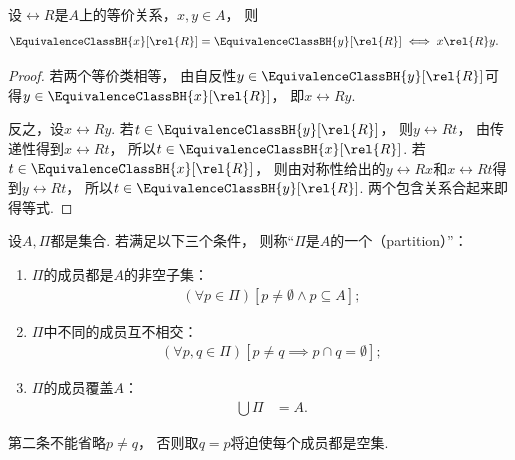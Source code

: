 \begin{lemma}\label{theorem:集合论.相等的等价类的代表等价}
    设\(\rel{R}\)是\(A\)上的等价关系，\(x,y\in A\)，
    则
    \begin{align*}
        \EquivalenceClassBH{x}[\rel{R}]=\EquivalenceClassBH{y}[\rel{R}]
        &\iff x\rel{R}y.
    \end{align*}
    \begin{proof}
        若两个等价类相等，
        由自反性\(y\in\EquivalenceClassBH{y}[\rel{R}]\)可得\(y\in\EquivalenceClassBH{x}[\rel{R}]\)，
        即\(x\rel{R}y\).

        反之，设\(x\rel{R}y\).
        若\(t\in\EquivalenceClassBH{y}[\rel{R}]\)，
        则\(y\rel{R}t\)，
        由传递性得到\(x\rel{R}t\)，
        所以\(t\in\EquivalenceClassBH{x}[\rel{R}]\).
        若\(t\in\EquivalenceClassBH{x}[\rel{R}]\)，
        则由对称性给出的\(y\rel{R}x\)和\(x\rel{R}t\)得到\(y\rel{R}t\)，
        所以\(t\in\EquivalenceClassBH{y}[\rel{R}]\).
        两个包含关系合起来即得等式.
    \end{proof}
\end{lemma}

\begin{definition}\label{definition:集合论.划分的定义}
    设\(A,\Pi\)都是集合.
    若满足以下三个条件，
    则称“\(\Pi\)是\(A\)的一个（partition）”：
    \begin{enumerate}
        \item \(\Pi\)的成员都是\(A\)的非空子集：
        \begin{align*}
            (\forall p\in\Pi)[p\neq\emptyset\land p\subseteq A];
        \end{align*}
        \item \(\Pi\)中不同的成员互不相交：
        \begin{align*}
            (\forall p,q\in\Pi)[p\neq q\implies p\cap q=\emptyset];
        \end{align*}
        \item \(\Pi\)的成员覆盖\(A\)：
        \begin{align*}
            \bigcup\Pi&=A.
        \end{align*}
    \end{enumerate}
    第二条不能省略\(p\neq q\)，
    否则取\(q=p\)将迫使每个成员都是空集.
\end{definition}

